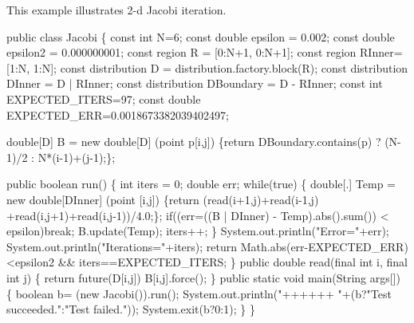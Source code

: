 
This example illustrates 2-d Jacobi iteration.

\begin{x10}
 public class Jacobi  \{
     const int N=6;
     const double epsilon = 0.002;
     const double epsilon2 = 0.000000001;
     const region R = [0:N+1, 0:N+1];
     const region RInner= [1:N, 1:N];
     const distribution D = distribution.factory.block(R);
     const distribution DInner = D | RInner;
     const distribution DBoundary = D - RInner;
     const int EXPECTED\_ITERS=97;
     const double EXPECTED\_ERR=0.0018673382039402497;
     
     double[D] B = new double[D] (point p[i,j])
         \{return DBoundary.contains(p) ? (N-1)/2 : N*(i-1)+(j-1);\};
     
     public boolean run() \{
        int iters = 0;
        double err;
        while(true) \{
          double[.] Temp = new double[DInner] (point [i,j]) 
                        \{return (read(i+1,j)+read(i-1,j)
                                +read(i,j+1)+read(i,j-1))/4.0;\};       
          if((err=((B | DInner) - Temp).abs().sum()) < epsilon)break; 
          B.update(Temp);
          iters++; 
        \}
        System.out.println("Error="+err);
        System.out.println("Iterations="+iters);
        return Math.abs(err-EXPECTED\_ERR)<epsilon2 \&\& iters==EXPECTED\_ITERS;
     \}
     public double read(final int i, final int j) \{
                return future(D[i,j]) {B[i,j]}.force();
     \}
     public static void main(String args[]) \{
        boolean b= (new Jacobi()).run();
        System.out.println("++++++ "+(b?"Test succeeded.":"Test failed."));
        System.exit(b?0:1);
     \}
\}
\end{x10}
